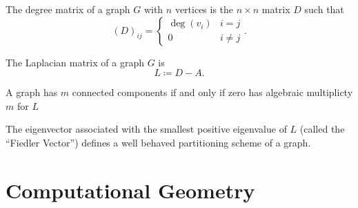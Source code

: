 \documentclass{beamer}
\begin{document}
\begin{frame}
    \begin{definition}
        The degree matrix of a graph $G$ with $n$ vertices is the $n \times n$ matrix $D$ such that
        \[
            (D)_{ij} = \begin{cases}
                \deg(v_i) & i = j \\
                0 & i \neq j
            \end{cases}
        .\]
    \end{definition}

    \begin{definition}
        The Laplacian matrix of a graph $G$ is
        \[
            L \coloneq D - A
        .\]
    \end{definition}

\end{frame}

\begin{frame}
    \begin{theorem}
        A graph has $m$ connected components if and only if zero has algebraic multiplicty $m$ for $L$
    \end{theorem}
    \begin{theorem}
        The eigenvector associated with the smallest positive eigenvalue of $L$ (called the ``Fiedler Vector'') defines a well behaved partitioning scheme of a graph.
    \end{theorem}
\end{frame}

\section{Computational Geometry}
\end{document}
